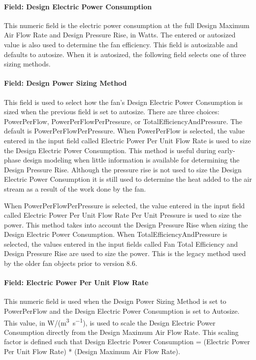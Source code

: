 \paragraph{Field: Design Electric Power Consumption}\label{field-design-elec-power-fansysmodel}

This numeric field is the electric power consumption at the full Design Maximum Air Flow Rate and Design Pressure Rise, in Watts. The entered or autosized value is also used to determine the fan efficiency. This field is autosizable and defaults to autosize. When it is autosized, the following field selects one of three sizing methods.

\paragraph{Field: Design Power Sizing Method}

This field is used to select how the fan's Design Electric Power Consumption is sized when the previous field is set to autosize.  There are three choices: PowerPerFlow, PowerPerFlowPerPressure, or TotalEfficiencyAndPressure.  The default is PowerPerFlowPerPressure.
When PowerPerFlow is selected, the value entered in the input field called Electric Power Per Unit Flow Rate is used to size the Design Electric Power Consumption. This method is useful during early-phase design modeling when little information is available for determining the Design Pressure Rise.  Although the pressure rise is not used to size the Design Electric Power Consumption it is still used to determine the heat added to the air stream as a result of the work done by the fan.

When PowerPerFlowPerPressure is selected, the value entered in the input field called Electric Power Per Unit Flow Rate Per Unit Pressure is used to size the power. This method takes into account the Design Pressure Rise when sizing the Design Electric Power Consumption.
When TotalEfficiencyAndPressure is selected, the values entered in the input fields called Fan Total Efficiency and Design Pressure Rise are used to size the power. This is the legacy method used by the older fan objects prior to version 8.6.

\paragraph{Field: Electric Power Per Unit Flow Rate}\label{field-power-per-unit-flow-fansysmodel}

This numeric field is used when the Design Power Sizing Method is set to PowerPerFlow and the Design Electric Power Consumption is set to Autosize. This value, in W/(\si{\m\cubed\per\s}), is used to scale the Design Electric Power Consumption directly from the Design Maximum Air Flow Rate. This scaling factor is defined such that Design Electric Power Consumption = (Electric Power Per Unit Flow Rate) * (Design Maximum Air Flow Rate).

